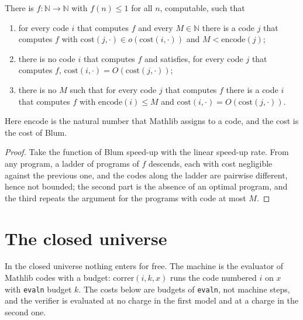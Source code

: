 \begin{theorem}
  \label{thm:information-blum-plane}
  \leanok
  There is $f : \mathbb{N} \to \mathbb{N}$ with $f(n) \le 1$ for all $n$, computable, such that
  \begin{enumerate}
    \item for every code $i$ that computes $f$ and every $M \in \mathbb{N}$ there is a code $j$
      that computes $f$ with $\mathrm{cost}(j, \cdot) \in o(\mathrm{cost}(i, \cdot))$ and
      $M < \mathrm{encode}(j)$;
    \item there is no code $i$ that computes $f$ and satisfies, for every code $j$ that computes
      $f$, $\mathrm{cost}(i, \cdot) = O(\mathrm{cost}(j, \cdot))$;
    \item there is no $M$ such that for every code $j$ that computes $f$ there is a code $i$ that
      computes $f$ with $\mathrm{encode}(i) \le M$ and $\mathrm{cost}(i, \cdot) =
      O(\mathrm{cost}(j, \cdot))$.
  \end{enumerate}
  Here $\mathrm{encode}$ is the natural number that Mathlib assigns to a code, and the cost is the
  cost of Blum.
  \own{}
\end{theorem}

\begin{proof}
  \leanok
  Take the function of Blum speed-up with the linear speed-up rate. From any program, a ladder of
  programs of $f$ descends, each with cost negligible against the previous one, and the codes along
  the ladder are pairwise different, hence not bounded; the second part is the absence of an
  optimal program, and the third repeats the argument for the programs with code at most $M$.
\end{proof}

\section{The closed universe}
\label{sec:information-closed-universe}

In the closed universe nothing enters for free. The machine is the evaluator of Mathlib codes with
a budget: $\mathrm{correr}(i, k, x)$ runs the code numbered $i$ on $x$ with \texttt{evaln} budget
$k$. The costs below are budgets of \texttt{evaln}, not machine steps, and the verifier is evaluated
at no charge in the first model and at a charge in the second one.

